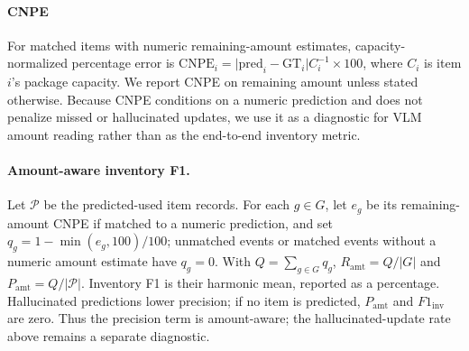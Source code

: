 \documentclass[sigconf,anonymous,nonacm]{acmart}
\begin{document}
\paragraph{CNPE}
\label{sec:cnpe}
For matched items with numeric remaining-amount estimates,
capacity-normalized percentage error is
$\mathrm{CNPE}_i=\lvert \mathrm{pred}_i-\mathrm{GT}_i\rvert C_i^{-1}
\times 100$, where $C_i$ is item $i$'s package capacity. We report CNPE
on remaining amount unless stated otherwise. Because CNPE conditions on
a numeric prediction and does not penalize missed or hallucinated
updates, we use it as a diagnostic for VLM amount reading rather than
as the end-to-end inventory metric.

\paragraph{Amount-aware inventory F1.}
Let $\mathcal{P}$ be the predicted-used item records. For each
$g \in G$, let $e_g$ be its remaining-amount CNPE if matched to a
numeric prediction, and set $q_g=1-\min(e_g,100)/100$; unmatched events
or matched events without a numeric amount estimate have $q_g=0$. With
$Q=\sum_{g \in G}q_g$,
$R_{\mathrm{amt}}=Q/|G|$ and
$P_{\mathrm{amt}}=Q/|\mathcal{P}|$. Inventory F1 is their harmonic
mean, reported as a percentage.
Hallucinated predictions lower precision; if no item is predicted,
$P_{\mathrm{amt}}$ and $F1_{\mathrm{inv}}$ are zero. Thus the precision
term is amount-aware; the hallucinated-update rate above remains a
separate diagnostic.

\end{document}
